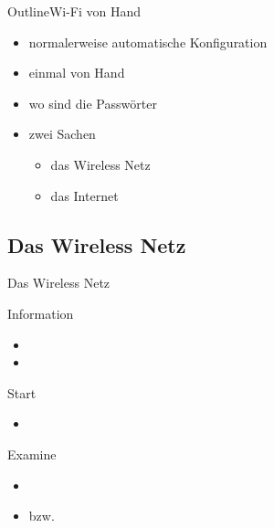 \begin{frame}{Outline}{Wi-Fi von Hand}
 \begin{itemize}
  \item normalerweise automatische Konfiguration
  \item einmal von Hand
  \item wo sind die Passwörter
  \item zwei Sachen 
  \begin{itemize}
   \item das Wireless Netz
   \item das Internet
  \end{itemize}
 \end{itemize}
\end{frame}

\subsection{Das Wireless Netz}
\begin{frame}{Das Wireless Netz}
\begin{block}{Information}
 \begin{itemize}
  \item {}
  \item {} 
 \end{itemize}
\end{block}
\begin{block}{Start}
 \begin{itemize}
  \item {}
 \end{itemize}
\end{block}
\begin{block}{Examine}
 \begin{itemize}
  \item {}
  \item {} bzw. 
 \end{itemize}
\end{block}
\end{frame}


